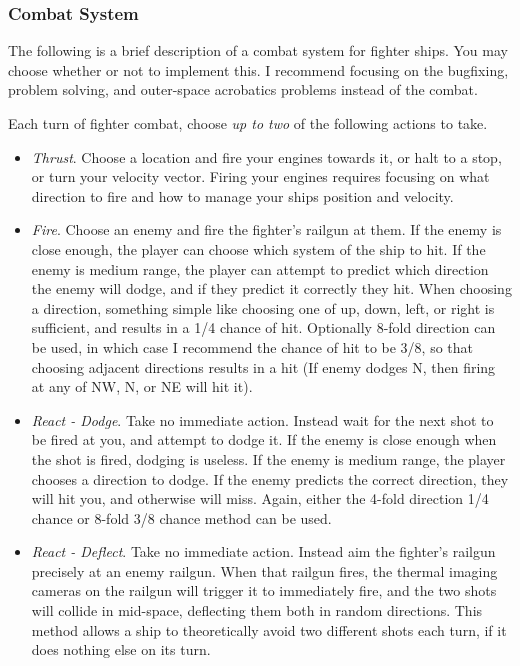 \documentclass[a4paper]{article}
\begin{document}
\subsubsection{Combat System} \label{fighter_combat_system}

The following is a brief description of a combat system for fighter ships. You may choose whether or not to implement this. I recommend focusing on the bugfixing, problem solving, and outer-space acrobatics problems instead of the combat.

Each turn of fighter combat, choose \textit{up to two} of the following actions to take.
\begin{itemize}
\item \textit{Thrust}. Choose a location and fire your engines towards it, or halt to a stop, or turn your velocity vector. Firing your engines requires focusing on what direction to fire and how to manage your ships position and velocity.
\item \textit{Fire}. Choose an enemy and fire the fighter's railgun at them. If the enemy is close enough, the player can choose which system of the ship to hit. If the enemy is medium range, the player can attempt to predict which direction the enemy will dodge, and if they predict it correctly they hit. When choosing a direction, something simple like choosing one of up, down, left, or right is sufficient, and results in a 1/4 chance of hit. Optionally 8-fold direction can be used, in which case I recommend the chance of hit to be 3/8, so that choosing adjacent directions results in a hit (If enemy dodges N, then firing at any of NW, N, or NE will hit it).
\item \textit{React - Dodge}. Take no immediate action. Instead wait for the next shot to be fired at you, and attempt to dodge it. If the enemy is close enough when the shot is fired, dodging is useless. If the enemy is medium range, the player chooses a direction to dodge. If the enemy predicts the correct direction, they will hit you, and otherwise will miss. Again, either the 4-fold direction 1/4 chance or 8-fold 3/8 chance method can be used.
\item \textit{React - Deflect}. Take no immediate action. Instead aim the fighter's railgun precisely at an enemy railgun. When that railgun fires, the thermal imaging cameras on the railgun will trigger it to immediately fire, and the two shots will collide in mid-space, deflecting them both in random directions. This method allows a ship to theoretically avoid two different shots each turn, if it does nothing else on its turn.
\end{itemize}
\end{document}
